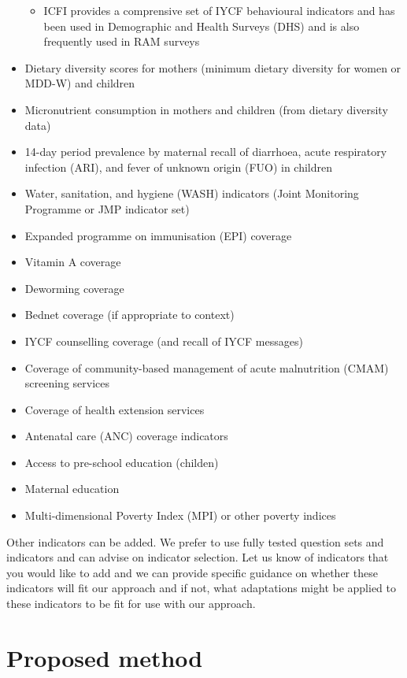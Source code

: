 \documentclass[12pt,a4paper]{article}
\providecommand{\tightlist}{%
  \setlength{\itemsep}{0pt}\setlength{\parskip}{0pt}}
\begin{document}
\begin{itemize}
  \begin{itemize}
  \tightlist
  \item
    ICFI provides a comprensive set of IYCF behavioural indicators and has been used in Demographic and Health Surveys (DHS) and is also frequently used in RAM surveys
  \end{itemize}
\item
  Dietary diversity scores for mothers (minimum dietary diversity for women or MDD-W) and children
\item
  Micronutrient consumption in mothers and children (from dietary diversity data)
\item
  14-day period prevalence by maternal recall of diarrhoea, acute respiratory infection (ARI), and fever of unknown origin (FUO) in children
\item
  Water, sanitation, and hygiene (WASH) indicators (Joint Monitoring Programme or JMP indicator set)
\item
  Expanded programme on immunisation (EPI) coverage
\item
  Vitamin A coverage
\item
  Deworming coverage
\item
  Bednet coverage (if appropriate to context)
\item
  IYCF counselling coverage (and recall of IYCF messages)
\item
  Coverage of community-based management of acute malnutrition (CMAM) screening services
\item
  Coverage of health extension services
\item
  Antenatal care (ANC) coverage indicators
\item
  Access to pre-school education (childen)
\item
  Maternal education
\item
  Multi-dimensional Poverty Index (MPI) or other poverty indices
\end{itemize}

Other indicators can be added. We prefer to use fully tested question sets and indicators and can advise on indicator selection. Let us know of indicators that you would like to add and we can provide specific guidance on whether these indicators will fit our approach and if not, what adaptations might be applied to these indicators to be fit for use with our approach.

\hypertarget{proposed-method}{%
\section{Proposed method}\label{proposed-method}}
\end{document}

